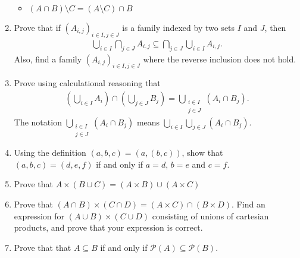 \documentclass[letterpaper,10pt,english]{sphinxmanual}
\begin{document}
\begin{enumerate}
\begin{itemize}
\item {} 
\sphinxAtStartPar
\((A \cap B) \setminus C = (A \setminus C) \cap B\)

\end{itemize}

\item {} 
\sphinxAtStartPar
Prove that if \((A_{i,j})_{i \in I, j \in J}\) is a family indexed by two sets \(I\) and \(J\), then
\begin{equation*}
\begin{split}\bigcup_{i \in I}\bigcap_{j \in J} A_{i, j} \subseteq \bigcap_{j \in J}\bigcup_{i \in I} A_{i, j}.\end{split}
\end{equation*}
\sphinxAtStartPar
Also, find a family \((A_{i,j})_{i \in I, j \in J}\) where the reverse inclusion does not hold.

\item {} 
\sphinxAtStartPar
Prove using calculational reasoning that
\begin{equation*}
\begin{split}\left(\bigcup_{i \in I}A_i\right)\cap \left(\bigcup_{j \in J}B_j\right) = \bigcup_{\substack{i \in I \\ j \in J}}(A_i \cap B_j).\end{split}
\end{equation*}
\sphinxAtStartPar
The notation \(\bigcup_{\substack{i \in I \\ j \in J}}(A_i \cap B_j)\) means \(\bigcup_{i \in I} \bigcup_{j \in J}(A_i \cap B_j)\).

\item {} 
\sphinxAtStartPar
Using the definition \((a, b, c) = (a, (b, c))\), show that \((a, b, c) = (d, e, f)\) if and only if \(a = d\), \(b = e\) and \(c = f\).

\item {} 
\sphinxAtStartPar
Prove that \(A \times (B \cup C) = (A \times B) \cup (A \times C)\)

\item {} 
\sphinxAtStartPar
Prove that \((A \cap B) \times (C \cap D) = (A \times C) \cap (B \times D)\). Find an expression for \((A \cup B) \times (C \cup D)\) consisting of unions of cartesian products, and prove that your expression is correct.

\item {} 
\sphinxAtStartPar
Prove that that \(A \subseteq B\) if and only if \(\mathcal P(A) \subseteq \mathcal P(B)\).

\end{enumerate}
\end{document}

